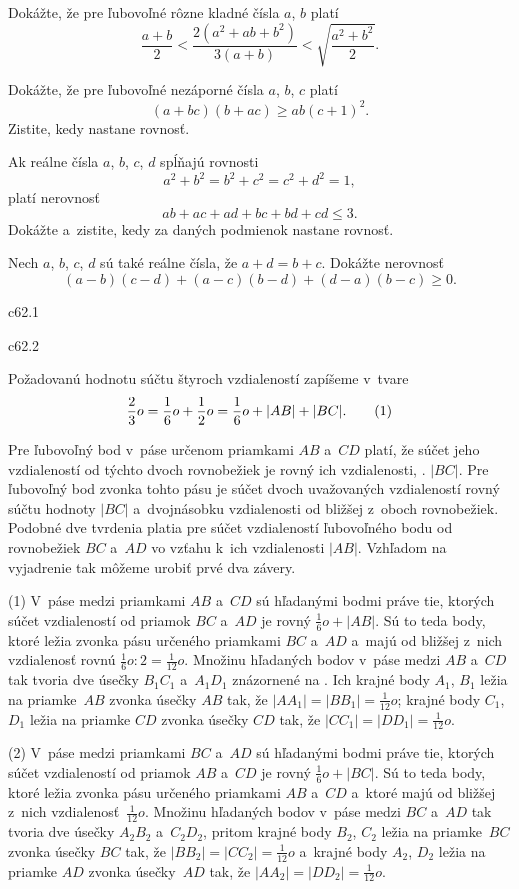 {Dokážte, že pre ľubovoľné rôzne kladné čísla $a$, $b$ platí
$$
\frac{a+b}{2}<\frac{2(a^2+ab+b^2)}{3(a+b)}<\sqrt{\frac{a^2+b^2}{2}}.
$$
\vpravo{[58--C--I--6]}

Dokážte, že pre ľubovoľné nezáporné čísla $a$, $b$, $c$ platí
$$
(a+bc)(b+ac)\ge ab(c+1)^2.
$$
Zistite, kedy nastane rovnosť.
\vpravo{[58--C--S--1]}

Ak reálne čísla $a$, $b$, $c$, $d$ spĺňajú rovnosti
$$
a^{2}+b^{2}=b^{2}+c^{2}=c^{2}+d^{2}=1,
$$
platí nerovnosť
$$
ab + ac + ad + bc + bd + cd\le3.
$$
Dokážte a~zistite, kedy za daných podmienok nastane rovnosť.
\vpravo{[55--C--II--2]}

Nech $a$, $b$, $c$, $d$ sú také reálne čísla, že $a+d=b+c$.
Dokážte nerovnosť
$$
(a-b)(c-d)+(a-c)(b-d)+(d-a)(b-c)\ge0.
$$
\vpravo{[54--C--I--1]}
}

{%
\mppic c62.1 \hfil\Obr \par
\mppic c62.2 \hfil\Obr \par
Požadovanú hodnotu súčtu štyroch vzdialeností zapíšeme v~tvare
$$
\frac23o=\frac16o+\frac12o=\frac16o+|AB|+|BC|.
\tag1
$$

Pre ľubovoľný bod v~páse určenom priamkami $AB$ a~$CD$ platí,
že súčet jeho vzdialeností od týchto dvoch rovnobežiek
je rovný ich vzdialenosti, \tj. $|BC|$. Pre ľubovoľný bod
zvonka tohto pásu je súčet dvoch uvažovaných vzdialeností rovný
súčtu hodnoty $|BC|$ a~dvojnásobku vzdialenosti od bližšej z~oboch rovnobežiek.
Podobné dve tvrdenia platia pre súčet vzdialeností ľubovoľného bodu od
rovnobežiek $BC$ a~$AD$ vo vzťahu k~ich vzdialenosti $|AB|$.
Vzhľadom na vyjadrenie  tak môžeme urobiť prvé dva závery.

\ite(1) V~páse medzi priamkami $AB$ a~$CD$ sú hľadanými bodmi
práve tie, ktorých súčet vzdialeností od priamok $BC$ a~$AD$
je rovný $\frac16o+|AB|$. Sú to teda body, ktoré ležia zvonka
pásu určeného priamkami $BC$ a~$AD$ a~majú od bližšej z~nich
vzdialenosť rovnú $\frac16o:2=\frac1{12}o$.
Množinu hľadaných bodov v~páse medzi
$AB$ a~$CD$ tak tvoria dve úsečky $B_1C_1$ a~$A_1D_1$ znázornené
na \obr. Ich krajné body $A_1$, $B_1$ ležia na priamke~$AB$ zvonka úsečky
$AB$ tak, že $|AA_1|=|BB_1|=\frac1{12}o$; krajné body $C_1$, $D_1$
ležia na priamke $CD$ zvonka úsečky $CD$ tak, že
$|CC_1|=|DD_1|=\frac1{12}o$.
\inspicture

\ite(2) V~páse medzi priamkami $BC$ a~$AD$ sú hľadanými bodmi
práve tie, ktorých súčet vzdialeností od priamok $AB$ a~$CD$
je rovný $\frac16o+|BC|$. Sú to teda body, ktoré ležia zvonka
pásu určeného priamkami $AB$ a~$CD$ a~ktoré majú od bližšej z~nich
vzdialenosť~$\frac1{12}o$. Množinu hľadaných bodov v~páse medzi
$BC$ a~$AD$ tak tvoria dve úsečky $A_2B_2$ a~$C_2D_2$, pritom
krajné body $B_2$, $C_2$ ležia na priamke~$BC$ zvonka úsečky
$BC$ tak, že $|BB_2|=|CC_2|=\frac1{12}o$ a~krajné body $A_2$, $D_2$
ležia na priamke $AD$ zvonka úsečky~$AD$ tak, že
$|AA_2|=|DD_2|=\frac1{12}o$.

}
